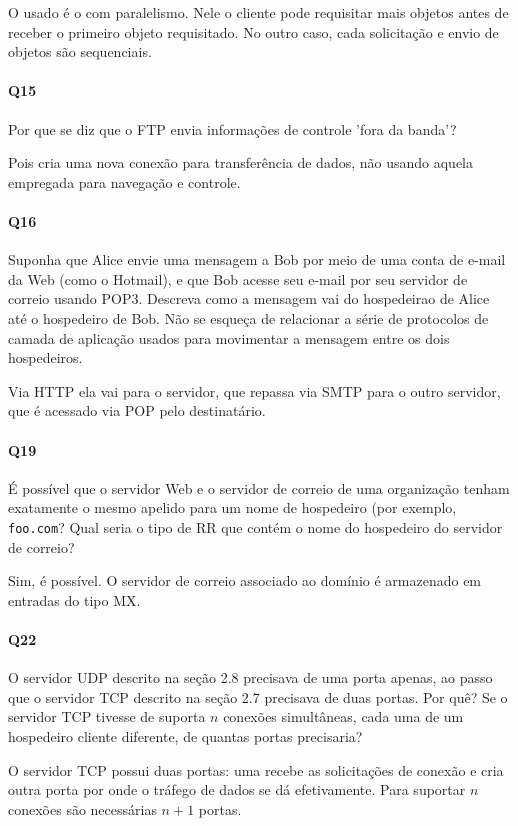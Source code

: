 O usado é o com paralelismo. Nele o cliente pode requisitar mais objetos antes de receber o primeiro objeto requisitado. No outro caso, cada solicitação e envio de objetos são sequenciais.

\paragraph{Q15} Por que se diz que o FTP envia informações de controle 'fora da banda'?

Pois cria uma nova conexão para transferência de dados, não usando aquela empregada para navegação e controle.

\paragraph{Q16} Suponha que Alice envie uma mensagem a Bob por meio de uma conta de e-mail da Web (como o Hotmail), e que Bob acesse seu e-mail por seu servidor de correio usando POP3. Descreva como a mensagem vai do hospedeirao de Alice até o hospedeiro de Bob. Não se esqueça de relacionar a série de protocolos de camada de aplicação usados para movimentar a mensagem entre os dois hospedeiros.

Via HTTP ela vai para o servidor, que repassa via SMTP para o outro servidor, que é acessado via POP pelo destinatário.

\paragraph{Q19} É possível que o servidor Web e o servidor de correio de uma organização tenham exatamente o mesmo apelido para um nome de hospedeiro (por exemplo, \texttt{foo.com}? Qual seria o tipo de RR que contém o nome do hospedeiro do servidor de correio?

Sim, é possível. O servidor de correio associado ao domínio é armazenado em entradas do tipo MX.

\paragraph{Q22} O servidor UDP descrito na seção 2.8 precisava de uma porta apenas, ao passo que o servidor TCP descrito na seção 2.7 precisava de duas portas. Por quê? Se o servidor TCP tivesse de suporta $n$ conexões simultâneas, cada uma de um hospedeiro cliente diferente, de quantas portas precisaria?

O servidor TCP possui duas portas: uma recebe as solicitações de conexão e cria outra porta por onde o tráfego de dados se dá efetivamente.
Para suportar $n$ conexões são necessárias $n+1$ portas.

